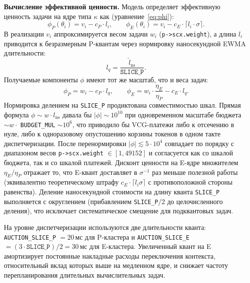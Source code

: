 \documentclass[14pt, oneside]{extbook}
\begin{document}
        \textbf{Вычисление эффективной ценности.}
        Модель определяет эффективную ценность задачи на ядре
        типа $\kappa$ как (уравнение~\eqref{eq:phi}):
        \[
                \phi_P(\theta_i) = v_i - c_P \cdot l_i, \qquad
                \phi_E(\theta_i) = v_i - c_E \cdot \lceil l_i \cdot
                \sigma \rceil.
        \]
        В реализации $v_i$ аппроксимируется весом задачи $w_i$
        (\texttt{p->scx.weight}), а длина $l_i$ приводится к
        безразмерным P-квантам через нормировку наносекундной
        EWMA длительности:
        \[
                l_q = \frac{\hat l_{\mathrm{ns}}}{\texttt{SLICE\_P}}.
        \]
        Получаемые компоненты $\phi$ имеют тот же масштаб, что и
        веса задач:
        \[
                \phi_P = w_i - c_P \cdot l_q, \qquad
                \phi_E = w_i \cdot \frac{\eta_E}{\eta_P} -
                c_E \cdot l_q.
        \]
        Нормировка делением на \texttt{SLICE\_P} продиктована
        совместимостью шкал. Прямая формула $\phi \sim w \cdot
        l_{\mathrm{ns}}$ давала бы $|\phi| \sim 10^{10}$ при
        одновременном масштабе бюджета $\sim w \cdot$
        \texttt{BUDGET\_MUL} $\sim 10^6$, что приводило бы
        VCG-платежи либо к отсечению в нуле, либо к одноразовому
        опустошению корзины токенов в одном такте
        диспетчеризации. После перенормировки $|\phi| \lesssim
        5 \cdot 10^4$ совпадает по порядку с диапазоном весов
        \texttt{p->scx.weight} $\in [1, 49152]$ и согласуется
        как со шкалой бюджета, так и со шкалой платежей.
        Дисконт ценности на E-ядре множителем
        $\eta_E/\eta_P$ отражает то, что E-квант доставляет в
        $\sigma^{-1}$ раз меньше полезной работы (эквивалентно
        теоретическому штрафу $c_E \cdot \lceil l_i \sigma \rceil$
        с противоположной стороны равенства). Деление
        наносекундной стоимости на длину кванта \texttt{SLICE\_P}
        выполняется с округлением (прибавлением \texttt{SLICE\_P}/2
        до целочисленного деления), что исключает систематическое
        смещение для подквантовых задач.

        На уровне диспетчеризации используются две
        длительности кванта:
        \texttt{AUCTION\_SLICE\_P} $= 20$\,мс для P-кластера и
        \texttt{AUCTION\_SLICE\_E} $= (3 \cdot \texttt{SLICE\_P})/2
        = 30$\,мс для E-кластера. Увеличенный квант на E
        амортизирует постоянные накладные расходы переключения
        контекста, относительный вклад которых выше на медленном
        ядре, и снижает частоту перепланирования длительных
        вычислительных задач.
\end{document}
